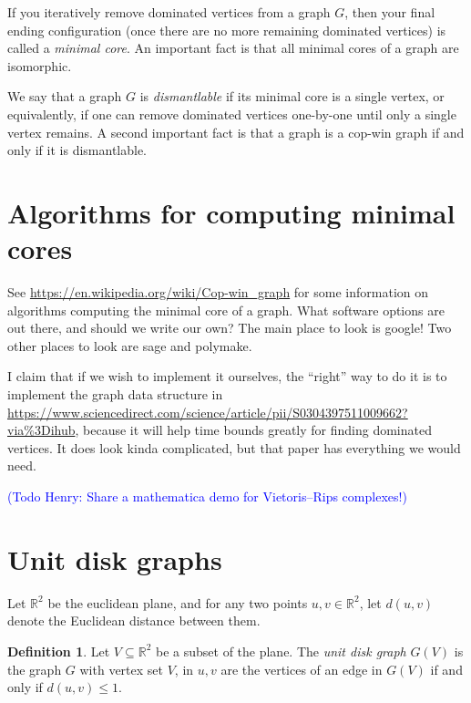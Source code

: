 \documentclass[amscd, amssymb, verbatim]{amsart}[12pt]
\newcommand{\note}[1]{\textcolor{blue}{({#1})}}
\theoremstyle{plain}
\theoremstyle{definition}
\newtheorem{definition}[lemma]{Definition}
\newcommand{\R}{\mathbb{R}}
\begin{document}

If you iteratively remove dominated vertices from a graph $G$, then your final ending configuration (once there are no more remaining dominated vertices) is called a \emph{minimal core}.
An important fact is that all minimal cores of a graph are isomorphic.

We say that a graph $G$ is \emph{dismantlable} if its minimal core is a single vertex, or equivalently, if one can remove dominated vertices one-by-one until only a single vertex remains.
A second important fact is that a graph is a cop-win graph if and only if it is dismantlable.



\section{Algorithms for computing minimal cores}
See \url{https://en.wikipedia.org/wiki/Cop-win\_graph} for some information on algorithms computing the minimal core of a graph.
What software options are out there, and should we write our own?
The main place to look is google!
Two other places to look are sage and polymake.

I claim that if we wish to implement it ourselves, the ``right'' way to do it is to implement the graph data structure in \url{https://www.sciencedirect.com/science/article/pii/S0304397511009662?via\%3Dihub}, because it will help time bounds greatly for finding dominated vertices.  It does look kinda complicated, but that paper has everything we would need. 

\note{Todo Henry: Share a mathematica demo for Vietoris--Rips complexes!}



\section{Unit disk graphs}

Let $\R^2$ be the euclidean plane, and for any two points $u,v\in\R^2$, let $d(u,v)$ denote the Euclidean distance between them.

\begin{definition}
Let $V \subseteq \R^2$ be a subset of the plane.
The \emph{unit disk graph} $G(V)$ is the graph $G$ with vertex set $V$, in $u,v$ are the vertices of an edge in $G(V)$ if and only if $d(u,v) \leq 1$.
\end{definition}
\end{document}
